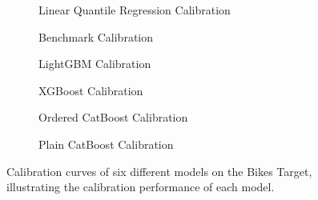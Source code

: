 \begin{figure}[htbp]
    \centering
    \begin{subfigure}[b]{0.5\textwidth}
        \centering
        
        \caption{Linear Quantile Regression Calibration}
        \label{fig:small-orfe-calibration}
    \end{subfigure}%
    \begin{subfigure}[b]{0.5\textwidth}
        \centering
        
        \caption{Benchmark Calibration}
        \label{fig:armed-play-calibration}
    \end{subfigure}
    
    \begin{subfigure}[b]{0.5\textwidth}
        \centering
        
        \caption{LightGBM Calibration}
        \label{fig:mangy-flux-calibration}
    \end{subfigure}%
    \begin{subfigure}[b]{0.5\textwidth}
        \centering
        
        \caption{XGBoost Calibration}
        \label{fig:couth-ruby-calibration}
    \end{subfigure}
    
    \begin{subfigure}[b]{0.5\textwidth}
        \centering
        
        \caption{Ordered CatBoost Calibration}
        \label{fig:civil-leas-calibration}
    \end{subfigure}%
    \begin{subfigure}[b]{0.5\textwidth}
        \centering
        
        \caption{Plain CatBoost Calibration}
        \label{fig:blear-dita-calibration}
    \end{subfigure}
    
    \caption{Calibration curves of six different models on the Bikes Target, illustrating the calibration performance of each model.}
    \label{fig:bikes_calibration}
\end{figure}

